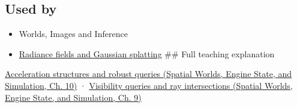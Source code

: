 \subsection{Used by}\label{appendix-0b426c47dd78-used-by}

\begin{itemize}
\item
  {Worlds, Images and Inference}
\item
  \hyperref[appendix-c5b332e400e7]{Radiance fields and Gaussian splatting} \#\# Full teaching explanation
\end{itemize}

\href{../05-Spatial-Worlds-Engine-State-and-Simulation/main.pdf\#nameddest=04-visual-computing-ii-ch029-acceleration-structures-and-robust-queries-1}{Acceleration structures and robust queries (Spatial Worlds, Engine State, and Simulation, Ch. 10)} · \href{../05-Spatial-Worlds-Engine-State-and-Simulation/main.pdf\#nameddest=04-visual-computing-ii-ch028-visibility-queries-and-ray-intersections-1}{Visibility queries and ray intersections (Spatial Worlds, Engine State, and Simulation, Ch. 9)}
